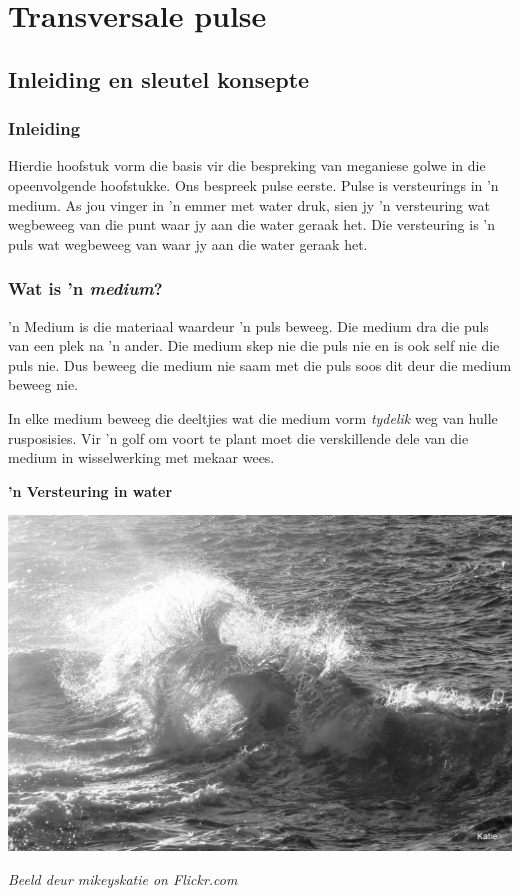 \chapter{Transversale pulse}
         

\section{Inleiding en sleutel konsepte}
    \nopagebreak
    \label{m38801*cid2}
            \subsection*{Inleiding}
            \nopagebreak
Hierdie hoofstuk vorm die basis vir die bespreking van meganiese golwe in die opeenvolgende hoofstukke. Ons bespreek pulse eerste. Pulse is versteurings in 'n medium. As jou vinger in 'n emmer met water druk, sien jy 'n versteuring wat wegbeweeg van die punt waar jy aan die water geraak het. Die versteuring is 'n puls wat wegbeweeg van waar jy aan die water geraak het.
            

\subsection*{Wat is 'n \textsl{medium}?}
            \nopagebreak
\begin{minipage}{.5\textwidth}

 'n Medium is die materiaal waardeur 'n puls beweeg. Die medium dra die puls van een plek na 'n ander. Die medium skep nie die puls nie en is ook self nie die puls nie. Dus beweeg die medium nie saam met die puls soos dit deur die medium beweeg nie.

In elke medium beweeg die deeltjies wat die medium vorm \textit{tydelik} weg van hulle rusposisies. Vir 'n golf om voort te plant moet die verskillende dele van die medium in wisselwerking met mekaar wees.
\end{minipage}
\begin{minipage}{.5\textwidth}
\begin{center}
\textbf{ 'n Versteuring in water}\par
 \includegraphics[width=.8\textwidth]{photos/waveby-mikeyskatie-flickr.jpg}\par
\textit{\small Beeld deur mikeyskatie on Flickr.com}
\end{center}
\end{minipage}


